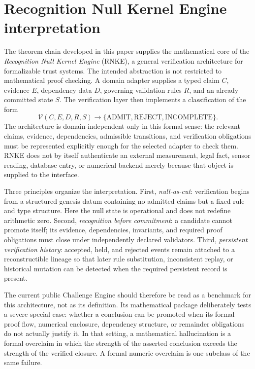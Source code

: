 \section{Recognition Null Kernel Engine interpretation}

The theorem chain developed in this paper supplies the mathematical core of the \emph{Recognition Null Kernel Engine} (RNKE), a general verification architecture for formalizable trust systems. The intended abstraction is not restricted to mathematical proof checking. A domain adapter supplies a typed claim $C$, evidence $E$, dependency data $D$, governing validation rules $R$, and an already committed state $S$. The verification layer then implements a classification of the form
\begin{equation}
\mathcal V(C,E,D,R,S)
\longrightarrow
\{\mathrm{ADMIT},\mathrm{REJECT},\mathrm{INCOMPLETE}\}.
\label{eq:rnke-abstract-contract}
\end{equation}
The architecture is domain-independent only in this formal sense: the relevant claims, evidence, dependencies, admissible transitions, and verification obligations must be represented explicitly enough for the selected adapter to check them. RNKE does not by itself authenticate an external measurement, legal fact, sensor reading, database entry, or numerical backend merely because that object is supplied to the interface.

Three principles organize the interpretation. First, \emph{null-as-cut}: verification begins from a structured genesis datum containing no admitted claims but a fixed rule and type structure. Here the null state is operational and does not redefine arithmetic zero. Second, \emph{recognition before commitment}: a candidate cannot promote itself; its evidence, dependencies, invariants, and required proof obligations must close under independently declared validators. Third, \emph{persistent verification history}: accepted, held, and rejected events remain attached to a reconstructible lineage so that later rule substitution, inconsistent replay, or historical mutation can be detected when the required persistent record is present.

The current public Challenge Engine should therefore be read as a benchmark for this architecture, not as its definition. Its mathematical package deliberately tests a severe special case: whether a conclusion can be promoted when its formal proof flow, numerical enclosure, dependency structure, or remainder obligations do not actually justify it. In that setting, a mathematical hallucination is a formal overclaim in which the strength of the asserted conclusion exceeds the strength of the verified closure. A formal numeric overclaim is one subclass of the same failure.

